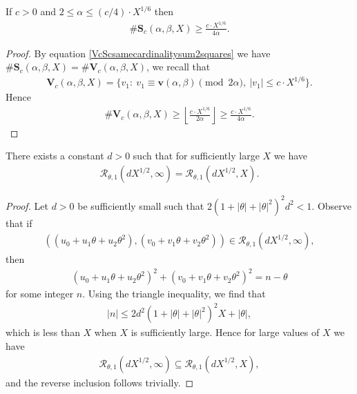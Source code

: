 \documentclass[12pt]{amsart}
\newcommand{\1}{\mathmybb{1}}
\begin{document}
\begin{lem}
\label{LowerboundScalphabetaX}
If $c > 0$ and $2 \leq \alpha \leq (c/4)\cdot X^{1/6}$ then
\begin{align*}
\#\mathbf{S}_{c}(\alpha,\beta,X) \geq \frac{c\cdot X^{1/6}}{4\alpha}.
\end{align*}
\end{lem}
\begin{proof}
By equation \eqref{VcScsamecardinalitysum2squares} we have $\#\mathbf{S}_{c}(\alpha,\beta,X) = \#\mathbf{V}_{c}(\alpha,\beta,X)$, we recall that 
\begin{align*}
\mathbf{V}_{c}(\alpha,\beta,X) =  \{v_{1}: \ v_{1} \equiv \mathbf{v}(\alpha,\beta) \pmod{2\alpha}, \ |v_{1}| \leq c\cdot X^{1/6}\}.
\end{align*}
Hence
\begin{align*}
\#\mathbf{V}_{c}(\alpha,\beta,X) \geq \left\lfloor \frac{c\cdot X^{1/6}}{2\alpha} \right\rfloor \geq \frac{c\cdot X^{1/6}}{4\alpha}.
\end{align*}
\par \vspace{-\baselineskip} \qedhere
\end{proof}
\begin{lem}
\label{Rtheta1dX1/2inftyinclusionlem}
There exists a constant $d>0$ such that for sufficiently large $X$ we have 
\begin{align*}
\mathcal{R}_{\theta,1}(d X^{1/2},\infty) =  \mathcal{R}_{\theta,1}(d X^{1/2},X).
\end{align*}
\end{lem}
\begin{proof}
Let $d>0$ be sufficiently small such that $2(1+|\theta|+|\theta|^2)^2 d^2 < 1$. Observe that if
\begin{align*}
((u_{0}+u_{1}\theta+u_{2}\theta^2), (v_{0}+v_{1}\theta+v_{2}\theta^2)) \in \mathcal{R}_{\theta,1}(d X^{1/2},\infty),
\end{align*}
then 
\begin{align*}
(u_{0}+u_{1}\theta+u_{2}\theta^2)^2 + (v_{0}+v_{1}\theta+v_{2}\theta^2)^2 = n-\theta
\end{align*}
for some integer $n$. Using the triangle inequality, we find that
\begin{align*}
|n| \leq 2d^2(1+|\theta|+|\theta|^2)^2 X + |\theta|,
\end{align*}
which is less than $X$ when $X$ is sufficiently large. Hence for large values of $X$ we have
\begin{align*}
\mathcal{R}_{\theta,1}(d X^{1/2},\infty) \subseteq  \mathcal{R}_{\theta,1}(d X^{1/2},X),
\end{align*}
and the reverse inclusion follows trivially.
\end{proof}
\end{document}
